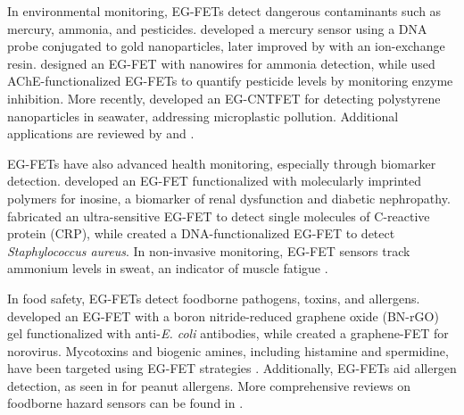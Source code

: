 In environmental monitoring, EG-FETs detect dangerous contaminants such as mercury, ammonia, and pesticides. \citet{knopfmacherHighly2014} developed a mercury sensor using a DNA probe conjugated to gold nanoparticles, later improved by \citet{alqahtaniBridged2023} with an ion-exchange resin. \citet{singhFabrication2021} designed an EG-FET with  nanowires for ammonia detection, while \citet{sasipongpanaExtended2017} used AChE-functionalized EG-FETs to quantify pesticide levels by monitoring enzyme inhibition. More recently, \citet{elliElectrolyteGated2024} developed an EG-CNTFET for detecting polystyrene nanoparticles in seawater, addressing microplastic pollution. Additional applications are reviewed by \citet{pullanoEGFETBased2018} and \citet{elliFieldEffect2022}.

EG-FETs have also advanced health monitoring, especially through biomarker detection. \citet{iskierkoExtendedgate2015} developed an EG-FET functionalized with molecularly imprinted polymers for inosine, a biomarker of renal dysfunction and diabetic nephropathy. \citet{macchiaSelective2019} fabricated an ultra-sensitive EG-FET to detect single molecules of C-reactive protein (CRP), while \citet{purwidyantriColloidal2018} created a DNA-functionalized EG-FET to detect \textit{Staphylococcus aureus}. In non-invasive monitoring, EG-FET sensors track ammonium levels in sweat, an indicator of muscle fatigue \citep{chenInvolvement2020, petrelliFlexible2022, petrelliNovel2022, petrelliMethod2023}.

In food safety, EG-FETs detect foodborne pathogens, toxins, and allergens. \citet{zaidanRapid2024} developed an EG-FET with a boron nitride-reduced graphene oxide (BN-rGO) gel functionalized with anti-\textit{E. coli} antibodies, while \citet{xiangInkjetPrinted2016} created a graphene-FET for norovirus. Mycotoxins and biogenic amines, including histamine and spermidine, have been targeted using EG-FET strategies \citep{ahDetection2012, minamiExtendedgate2015, shkodraFlexible2021, shkodraPolymeric2024}. Additionally, EG-FETs aid allergen detection, as seen in \citet{kimUltrasensitive2022} for peanut allergens. More comprehensive reviews on foodborne hazard sensors can be found in \citet{bobrinetskiyAdvances2021, kourtiOptical2023}.
